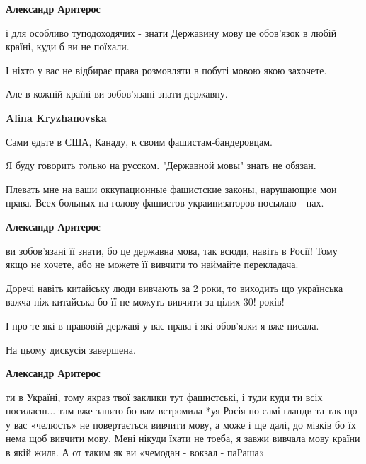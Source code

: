 \begin{itemize}
\begin{itemize}
\textbf{Александр Аритерос} 

і для особливо туподоходячих - знати Державину мову це обов’язок в любій країні, куди б ви не поїхали.

І ніхто у вас не відбирає права розмовляти в побуті мовою якою захочете.

Але в кожній країні ви зобов’язані знати державну.



\textbf{Alina Kryzhanovska} 

Сами едьте в США, Канаду, к своим фашистам-бандеровцам.

Я буду говорить только на русском. "Державной мовы" знать не обязан.

Плевать мне на ваши оккупационные фашистские законы, нарушающие мои права. Всех
больных на голову фашистов-украинизаторов посылаю - нах.


\textbf{Александр Аритерос} 

ви зобов’язані її знати, бо це державна мова, так всюди, навіть в Росії! Тому
якщо не хочете, або не можете її вивчити то наймайте перекладача.

Доречі навіть китайську люди вивчають за 2 роки, то виходить що українська
важча ніж китайська бо її не можуть вивчити за цілих 30! років!

І про те які в правовій державі у вас права і які обов’язки я вже писала.

На цьому дискусія завершена.



\textbf{Александр Аритерос} 

ти в Україні, тому якраз твої заклики тут фашистські, і туди куди ти всіх
посилаєш... там вже занято бо вам встромила *уя Росія по самі гланди та так що
у вас «челюсть» не повертається вивчити мову, а може і ще далі, до мізків бо їх
нема щоб вивчити мову. Мені нікуди їхати не тоеба, я завжи вивчала мову країни
в якій жила. А от таким як ви «чемодан - вокзал - паРаша»



\end{itemize}
\end{itemize}
